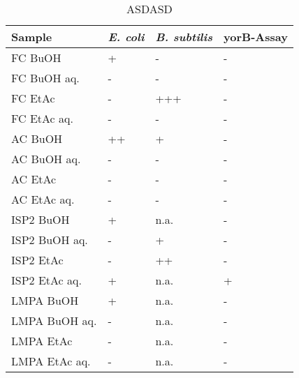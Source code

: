 



    \begin{table}[htbp]
        \caption{ASDASD}
        \label{tab:dddd}
        \centering
        \begin{tabularx}{\textwidth}{XXXX}
            \toprule
            \textbf{Sample} & \textbf{\textit{E. coli}}     & \textbf{\textit{B. subtilis}}  & \textbf{yorB-Assay}        \\
            \midrule
            FC BuOH         & +     & -     & -     \\
            FC BuOH aq.     & -     & -     & -     \\
            FC EtAc         & -     & +++   & -     \\
            FC EtAc aq.     & -     & -     & -     \\
            AC BuOH         & ++    & +     & -     \\
            AC BuOH aq.     & -     & -     & -     \\
            AC EtAc         & -     & -     & -     \\
            AC EtAc aq.     & -     & -     & -     \\
            ISP2 BuOH       & +     & n.a.  & -     \\
            ISP2 BuOH aq.   & -     & +     & -     \\
            ISP2 EtAc       & -     & ++    & -     \\
            ISP2 EtAc aq.   & +     & n.a.  & +     \\
            LMPA BuOH       & +     & n.a.  & -     \\
            LMPA BuOH aq.   & -     & n.a.  & -     \\
            LMPA EtAc       & -     & n.a.  & -     \\
            LMPA EtAc aq.   & -     & n.a.  & -     \\
            \bottomrule
        \end{tabularx}
    \end{table}



